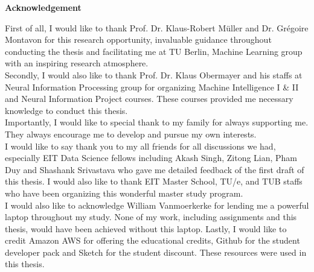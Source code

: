 \thispagestyle{empty}
\vspace*{3cm}
\begin{center}
    \textbf{Acknowledgement}
\end{center}

\noindent
First of all, I would like to thank Prof. Dr. Klaus-Robert M\"{u}ller and Dr. Gr\'{e}goire Montavon for this research opportunity, invaluable guidance throughout conducting the thesis and facilitating me at TU Berlin, Machine Learning group with an inspiring research atmosphere.
\\

\noindent
Secondly, I would also like to thank Prof. Dr. Klaus Obermayer and his staffs at Neural Information Processing group for organizing Machine Intelligence I \& II and Neural Information Project courses. These courses provided me necessary knowledge to conduct this thesis.
\\

\noindent
Importantly, I would like to special thank to my family for always supporting me. They always encourage me to develop and pursue my own interests.
\\

\noindent
I would like to say thank you to my all friends for all discussions we had, especially EIT Data Science fellows including Akash Singh, Zitong Lian, Pham Duy and Shashank Srivastava who gave me detailed feedback of the first draft of this thesis. I would also like to thank EIT Master School, TU/e, and TUB staffs who have been organizing this wonderful master study program.
\\

\noindent
I would also like to acknowledge William Vanmoerkerke for lending me a powerful laptop throughout my study. None of my work, including assignments and this thesis, would have been achieved without this laptop.  Lastly, I would like to credit Amazon AWS for offering the educational credits, Github for the student developer pack and Sketch for the student discount. These resources were used in this thesis.
